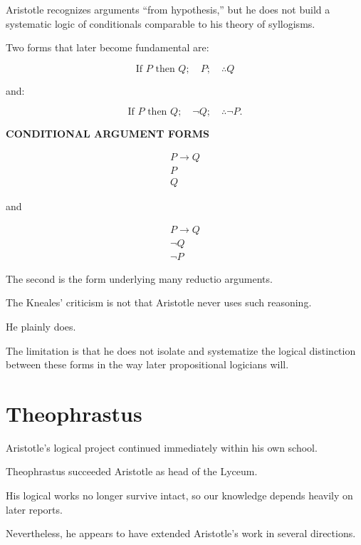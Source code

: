 \documentclass[11pt]{article}
\begin{document}
Aristotle recognizes arguments ``from hypothesis,'' but he does
not build a systematic logic of conditionals comparable to his
theory of syllogisms.

Two forms that later become fundamental are:

\[
\text{If }P\text{ then }Q;
\quad
P;
\quad
\therefore Q
\]

and:

\[
\text{If }P\text{ then }Q;
\quad
\neg Q;
\quad
\therefore\neg P.
\]

\newpage

\begin{whiteboard}
\textbf{CONDITIONAL ARGUMENT FORMS}

\[
\begin{array}{c}
P\rightarrow Q\\
P\\
\hline
Q
\end{array}
\]

and

\[
\begin{array}{c}
P\rightarrow Q\\
\neg Q\\
\hline
\neg P
\end{array}
\]
\end{whiteboard}

The second is the form underlying many reductio arguments.

The Kneales' criticism is not that Aristotle never uses such
reasoning.

He plainly does.

The limitation is that he does not isolate and systematize the
logical distinction between these forms in the way later
propositional logicians will.

\section{Theophrastus}

Aristotle's logical project continued immediately within his own
school.

Theophrastus succeeded Aristotle as head of the Lyceum.

His logical works no longer survive intact, so our knowledge
depends heavily on later reports.

Nevertheless, he appears to have extended Aristotle's work in
several directions.
\end{document}

